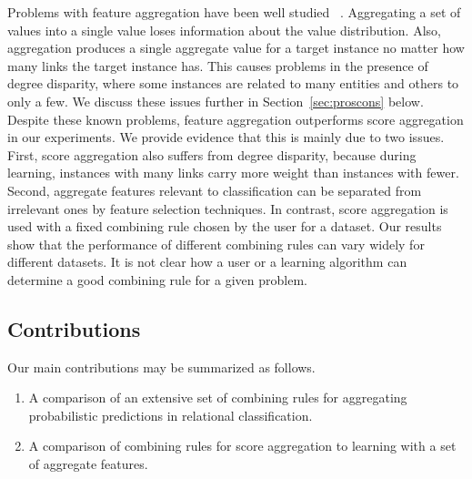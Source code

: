 \documentclass[conference]{IEEEtran}
\begin{document}
Problems with feature aggregation have been well studied~
\cite{Neville2003,Jensen2003}. Aggregating a set of values into a single value loses information about the value distribution. Also, aggregation produces a single aggregate value for a target instance no matter how many links the target instance has. This causes problems in the presence of degree disparity, where some instances are related to many entities and others to only a few. We discuss these issues further in Section~\ref{sec:proscons} below. Despite these known problems, feature aggregation outperforms score aggregation in our experiments. We provide evidence that this is mainly due to two issues. First, score aggregation also suffers from degree disparity, because during learning, instances with many links carry more weight than instances with fewer. Second,  aggregate features relevant to classification can be separated from irrelevant ones by feature selection techniques. In contrast, score aggregation is used with a fixed combining rule chosen by the user for a dataset. Our results show that the performance of different combining rules can vary widely for different datasets. It is not clear how a user or a learning algorithm can determine a good combining rule for a given problem.


\subsection{Contributions}
Our main contributions may be summarized as follows.

\begin{enumerate}
\item A comparison of an extensive set of combining rules for aggregating probabilistic predictions in relational classification.
\item A comparison of combining rules for score aggregation to learning with a set of aggregate features. %
\end{enumerate}
\end{document}
